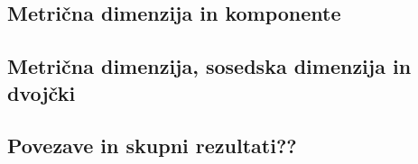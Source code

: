 \documentclass[mat1, tisk]{fmfdelo}
\begin{document}
\subsection{Metrična dimenzija in komponente}


\subsection{Metrična dimenzija, sosedska dimenzija in dvojčki}

\subsection{Povezave in skupni rezultati??}



\end{document}
